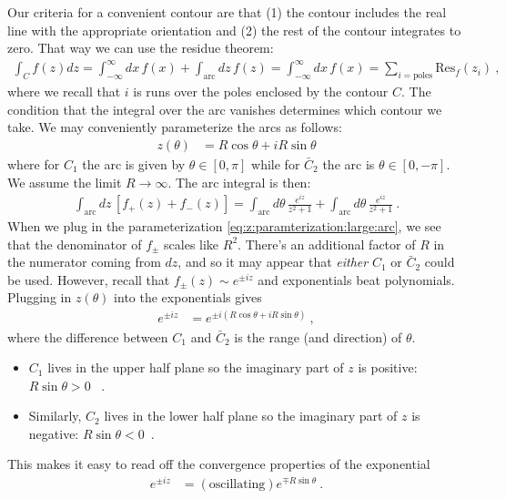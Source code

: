 Our criteria for a convenient contour are that (1) the contour includes the real line with the appropriate orientation and (2) the rest of the contour integrates to zero. That way we can use the residue theorem:
\begin{align}
	\int_C f(z) dz 
	= \int_{-\infty}^\infty dx\, f(x)
	+ \int_{\text{arc}}dz\, f(z) = 
	\int_{-\infty}^\infty dx\, f(x)
	= \sum_{i=\text{poles}}\text{Res}_f(z_i) \ ,
\end{align}
where we recall that $i$ is runs over the poles enclosed by the contour $C$. The condition that the integral over the arc vanishes determines which contour we take. We may conveniently parameterize the arcs as follows:
\begin{align}
	z(\theta) &= R\cos\theta + i R\sin\theta
	\label{eq:z:paramterization:large:arc}
\end{align}
where for $C_1$ the arc is given by $\theta \in [0,\pi]$ while for $\bar C_2$ the arc is $\theta\in[0,-\pi]$. We assume the limit $R\to \infty$. The arc integral is then:
\begin{align}
	\int_{\text{arc}}
	dz \, 
	\left[f_+(z) + f_-(z)\right]
	=
	\int_\text{arc}
	d\theta \, 
	\frac{e^{iz}}{z^2+1}
	+ 
	\int_\text{arc}
	d\theta \, 
	\frac{e^{iz}}{z^2+1} \ .
\end{align}
When we plug in the parameterization \eqref{eq:z:paramterization:large:arc}, we see that the denominator of $f_\pm$ scales like $R^2$. There's an additional factor of $R$ in the numerator coming from $dz$, and so it may  appear that \emph{either} $C_1$ or $\bar C_2$ could be used. However, recall that $f_{\pm}(z)\sim e^{\pm iz}$ and exponentials beat polynomials. Plugging in $z(\theta)$ into the exponentials gives
\begin{align}
	e^{\pm iz} &= e^{\pm i\left(R\cos\theta + i R\sin\theta\right)} \ ,
\end{align}
where the difference between $C_1$ and $\bar C_2$ is the range (and direction) of $\theta$.
\begin{itemize}
	\item $C_1$ lives in the upper half plane so the imaginary part of $z$ is positive: $R\sin\theta > 0$ \ .
	\item Similarly, $C_2$ lives in the lower half plane so the imaginary part of $z$ is negative: $R\sin\theta < 0$\ .	
\end{itemize}
This makes it easy to read off the convergence properties of the exponential
\begin{align}
	e^{\pm iz} &= (\text{oscillating})e^{\mp R\sin\theta} \ .
\end{align}
